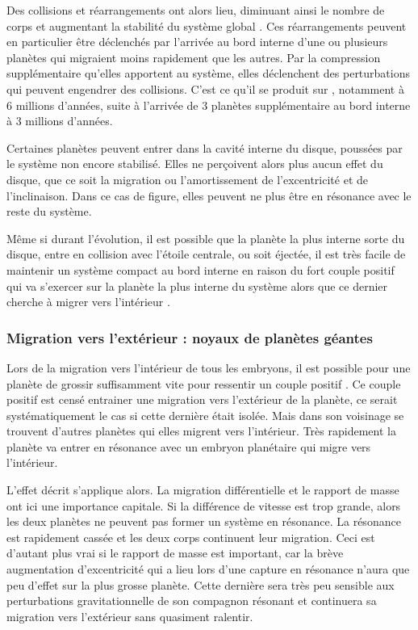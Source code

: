 Des collisions et réarrangements ont alors lieu, diminuant ainsi le nombre de corps et augmentant la stabilité du système global . Ces réarrangements peuvent en particulier être déclenchés par l'arrivée au bord interne d'une ou plusieurs planètes qui migraient moins rapidement que les autres. Par la compression supplémentaire qu'elles apportent au système, elles déclenchent des perturbations qui peuvent engendrer des collisions. C'est ce qu'il se produit sur  , notamment à 6 millions d'années, suite à l'arrivée de 3 planètes supplémentaire au bord interne à 3 millions d'années. 

\bigskip

Certaines planètes peuvent entrer dans la cavité interne du disque, poussées par le système non encore stabilisé. Elles ne perçoivent alors plus aucun effet du disque, que ce soit la migration ou l'amortissement de l'excentricité et de l'inclinaison. Dans ce cas de figure, elles peuvent ne plus être en résonance avec le reste du système. 

Même si durant l'évolution, il est possible que la planète la plus interne sorte du disque, entre en collision avec l'étoile
centrale, ou soit éjectée, il est très facile de maintenir un système compact au bord interne en raison du fort couple positif
qui va s'exercer sur la planète la plus interne du système alors que ce dernier cherche à migrer vers l'intérieur
\citep{masset2006disk, morbidelli2008building, terquem2007migration}.

\subsubsection{Migration vers l'extérieur : noyaux de planètes géantes}\label{sec:outward-case}
Lors de la migration vers l'intérieur de tous les embryons, il est possible pour une planète de grossir suffisamment vite pour ressentir un couple positif . Ce couple positif est censé entrainer une migration vers l'extérieur de la planète, ce serait systématiquement le cas si cette dernière était isolée. Mais dans son voisinage se trouvent d'autres planètes qui elles migrent vers l'intérieur. Très rapidement la planète va entrer en résonance avec un embryon planétaire qui migre vers l'intérieur.

L'effet décrit  s'applique alors. La migration différentielle et le rapport de masse ont ici une importance capitale. Si la différence de vitesse est trop grande, alors les deux planètes ne peuvent pas former un système en résonance. La résonance est rapidement cassée et les deux corps continuent leur migration. Ceci est d'autant plus vrai si le rapport de masse est important, car la brève augmentation d'excentricité qui a lieu lors d'une capture en résonance n'aura que peu d'effet sur la plus grosse planète. Cette dernière sera très peu sensible aux perturbations gravitationnelle de son compagnon résonant et continuera sa migration vers l'extérieur sans quasiment ralentir. 

